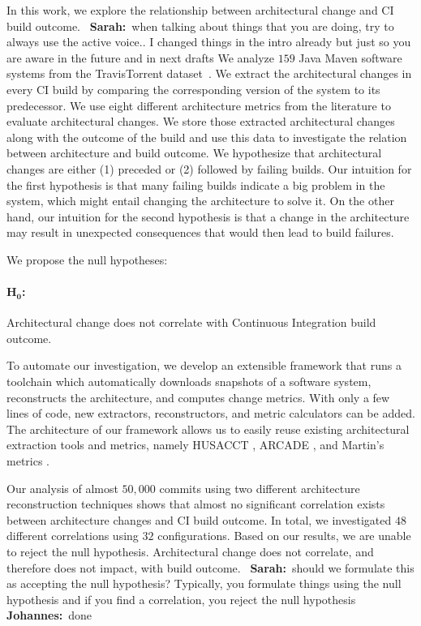 \documentclass[sigplan, anonymous, review]{acmart}
\newcommand{\sn}[1]{{\color{blue}\textbf{Sarah:}~#1}}
\newcommand{\jk}[1]{{\color{violet}\textbf{Johannes:}~#1}}
\begin{document}
In this work, we explore the relationship between architectural change and CI build outcome.
~\sn{when talking about things that you are doing, try to always use the active voice.. I changed things in the intro already but just so you are aware in the future and in next drafts}
We analyze $159$ Java Maven software systems from the TravisTorrent dataset~\cite{TravisTorrent}. 
We extract the architectural changes in every CI build by comparing the corresponding version of the system to its predecessor.
We use eight different architecture metrics from the literature to evaluate architectural changes.  
We store those extracted architectural changes along with the outcome of the build and use this data to investigate the relation between architecture and build outcome.
We hypothesize that architectural changes are either (1) preceded or (2) followed by failing builds. 
Our intuition for the first hypothesis is that many failing builds indicate a big problem in the system, which might entail changing the architecture to solve it. 
On the other hand, our intuition for the second hypothesis is that a change in the architecture may result in unexpected consequences that would then lead to build failures.

We propose the null hypotheses:

\paragraph{$\mathbf{H_0}$:} Architectural change does not correlate with Continuous Integration build outcome. 

To automate our investigation, we develop an extensible framework that runs a toolchain which automatically downloads snapshots of a software system, reconstructs the architecture, and computes change metrics. With only a few lines of code, new extractors, reconstructors, and metric calculators can be added. 
The architecture of our framework allows us to easily reuse existing architectural extraction tools and metrics, namely HUSACCT \cite{Husacct1}, ARCADE \cite{Arcade}, and Martin's metrics \cite{martinsMetrics}.

Our analysis of almost $50,000$ commits using two different architecture reconstruction techniques shows that almost no significant correlation exists between architecture changes and CI build outcome. In total, we investigated $48$ different correlations using $32$ configurations. Based on our results, we are unable to reject the null hypothesis. Architectural change does not correlate, and therefore does not impact, with build outcome.
~\sn{should we formulate this as accepting the null hypothesis? Typically, you formulate things using the null hypothesis and if you find a correlation, you reject the null hypothesis} \jk{done}
\end{document}
